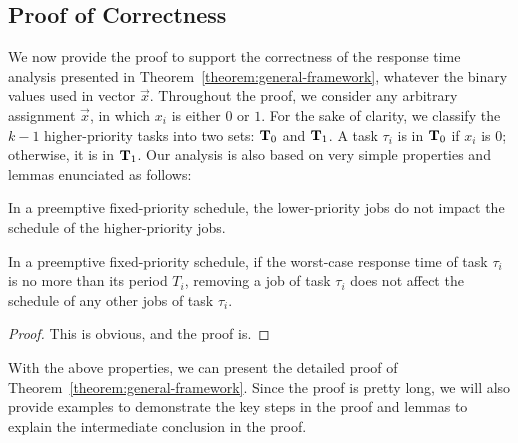 \subsection{Proof of Correctness}  
\label{sec:proof-th1}

We now provide the proof to support the correctness of the response time analysis presented in
Theorem~\ref{theorem:general-framework}, whatever the binary values
used in vector $\vec{x}$.  %
Throughout the proof, we consider any arbitrary assignment
$\vec{x}$, in which $x_i$ is either $0$ or $1$. For the sake of clarity, we classify the $k-1$
higher-priority tasks into two sets: ${\bf T}_0$ and ${\bf T}_1$. A
task $\tau_i$ is in ${\bf T}_0$ if $x_i$ is $0$; otherwise, it is in
${\bf T}_1$.
Our analysis is also based on very simple properties and lemmas enunciated as follows:

\begin{Property}
\label{prop:lower-priority}
In a preemptive fixed-priority schedule, the lower-priority jobs do not impact the schedule of the higher-priority jobs.
\end{Property}


\begin{Lemma}
\label{lemma:remove-same-task}
In a preemptive fixed-priority schedule, if the worst-case response
time of task $\tau_i$ is no more than its period $T_i$, removing a job of task $\tau_i$ does not affect the schedule of any other jobs of task $\tau_i$.
\end{Lemma}
\begin{proof}
This is obvious, and the proof is\citetechreport{}.
\end{proof}


With the above properties, we can present the detailed proof of
Theorem~\ref{theorem:general-framework}. Since the proof is pretty long, we 
will also provide examples to demonstrate the key steps in the proof and lemmas to explain the intermediate conclusion in the proof.

